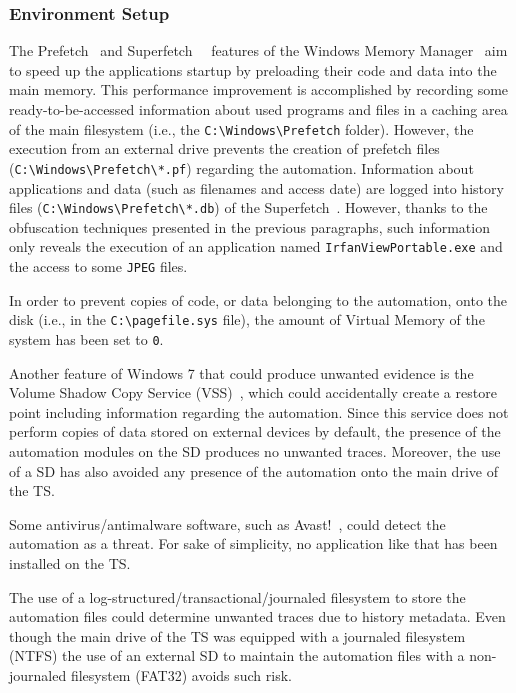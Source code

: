 \documentclass[10pt, conference]{IEEEtran}
\begin{document}
\subsubsection{Environment Setup}

The Prefetch~\cite{prefetcher} and Superfetch~\cite{superfetch1}~\cite{superfetch2} features of the Windows Memory
Manager~\cite{memoryman} aim to speed up the applications startup by preloading their code and data into the main memory. This performance
improvement is accomplished by recording some ready-to-be-accessed information about used programs and files in a caching area of the
main filesystem (i.e., the \verb=C:\Windows\Prefetch= folder). However, the execution from an external drive prevents the creation of prefetch files (\verb=C:\Windows\Prefetch\*.pf=) regarding the automation.
Information about applications and data (such as filenames and access date) are logged into history files (\verb=C:\Windows\Prefetch\*.db=) of the Superfetch~\cite{rewolf}. However, thanks to the obfuscation techniques presented in the previous paragraphs, such information only reveals the execution of an application named \verb=IrfanViewPortable.exe= and the access to some \verb=JPEG= files.


In order to prevent copies of code, or data belonging to the automation, onto the disk (i.e., in the \verb=C:\pagefile.sys= file), the amount of
Virtual Memory of the system has been set to \verb=0=.


Another feature of Windows 7 that could produce unwanted evidence is the Volume Shadow Copy Service (VSS)~\cite{vss}, which could
accidentally create a restore point including information regarding the automation. Since this service does not perform copies
of data stored on external devices by default, the presence of the automation modules on the SD produces no unwanted traces. Moreover, the use of a SD has also avoided any presence of the automation onto the main drive of the TS.


Some antivirus/antimalware software, such as Avast!~\cite{avast}, could detect the automation as a threat. For sake of simplicity, no application like that has been installed on the TS.


The use of a log-structured/transactional/journaled filesystem to store the automation files could determine unwanted traces due to history metadata. Even though the main drive of the TS was equipped with a journaled filesystem (NTFS) the use of an external SD to maintain the automation files with a non-journaled filesystem (FAT32) avoids such risk.
\end{document}
